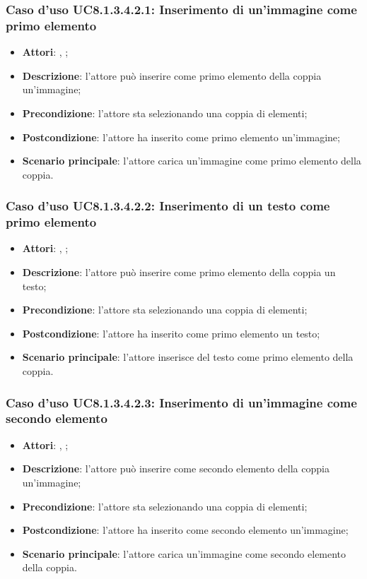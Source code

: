 		\subsubsection{Caso d'uso UC8.1.3.4.2.1: Inserimento di un'immagine come primo elemento}
		\label{UC8.1.3.4.2.1}
		\begin{itemize}
			\item \textbf{Attori}: \uau, \uaupro;
			\item \textbf{Descrizione}: l'attore può inserire come primo elemento della coppia un'immagine;
			\item \textbf{Precondizione}: l'attore sta selezionando una coppia di elementi;
			\item \textbf{Postcondizione}: l'attore ha inserito come primo elemento un'immagine;
			\item \textbf{Scenario principale}: l'attore carica un'immagine come primo elemento della coppia.
		\end{itemize}
		
		\subsubsection{Caso d'uso UC8.1.3.4.2.2: Inserimento di un testo come primo elemento}
		\label{UC8.1.3.4.2.2}
		\begin{itemize}
			\item \textbf{Attori}: \uau, \uaupro;
			\item \textbf{Descrizione}: l'attore può inserire come primo elemento della coppia un testo;
			\item \textbf{Precondizione}: l'attore sta selezionando una coppia di elementi;
			\item \textbf{Postcondizione}: l'attore ha inserito come primo elemento un testo;
			\item \textbf{Scenario principale}: l'attore inserisce del testo come primo elemento della coppia.
		\end{itemize}
		
			\subsubsection{Caso d'uso UC8.1.3.4.2.3: Inserimento di un'immagine come secondo elemento}
		\label{UC8.1.3.4.2.3}
		\begin{itemize}
			\item \textbf{Attori}: \uau, \uaupro;
			\item \textbf{Descrizione}: l'attore può inserire come secondo elemento della coppia un'immagine;
			\item \textbf{Precondizione}: l'attore sta selezionando una coppia di elementi;
			\item \textbf{Postcondizione}: l'attore ha inserito come secondo elemento un'immagine;
			\item \textbf{Scenario principale}: l'attore carica un'immagine come secondo elemento della coppia.
		\end{itemize}
		
